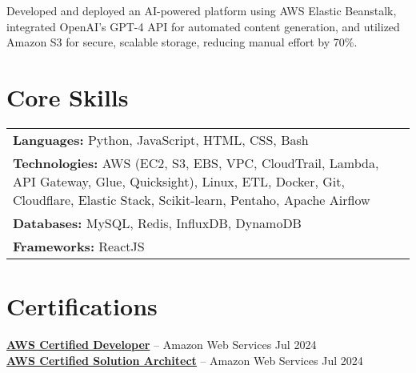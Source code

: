 \documentclass[10pt, letterpaper]{article}
\begin{document}
Developed and deployed an AI-powered platform using AWS Elastic Beanstalk, integrated OpenAI's GPT-4 API for automated content generation, and utilized Amazon S3 for secure, scalable storage, reducing manual effort by 70\%.

\vspace{0.05cm}

\section{Core Skills}
\begin{tabularx}{\textwidth}{>{\raggedright\arraybackslash}X}
\textbf{Languages:} Python, JavaScript, HTML, CSS, Bash \\
\textbf{Technologies:} AWS (EC2, S3, EBS, VPC, CloudTrail, Lambda, API Gateway, Glue, Quicksight), Linux, ETL, Docker, Git, Cloudflare, Elastic Stack, Scikit-learn, Pentaho, Apache Airflow\\
\textbf{Databases:} MySQL, Redis, InfluxDB, DynamoDB \\
\textbf{Frameworks:} ReactJS \\
\end{tabularx}

\vspace{0.05cm}

\section{Certifications}
\textbf{\href{https://cp.certmetrics.com/amazon/en/public/verify/credential/dc7c20379cf94f2699a4d430c31ac969}{AWS Certified Developer}} -- Amazon Web Services \hfill Jul 2024 \\
\textbf{\href{https://cp.certmetrics.com/amazon/en/public/verify/credential/7ec7fce4db1f4b1bab3b6f8caa3f509b}{AWS Certified Solution Architect}} -- Amazon Web Services \hfill Jul 2024
\end{document}
